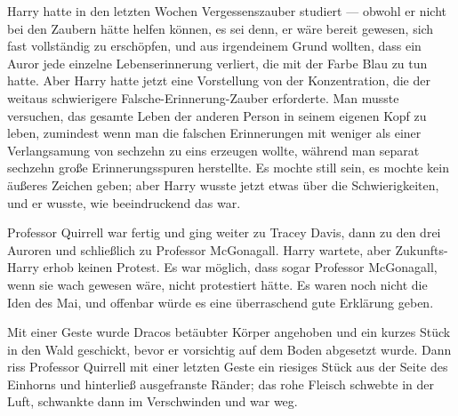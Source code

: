 Harry hatte in den letzten Wochen Vergessenszauber studiert — obwohl er nicht bei den Zaubern hätte helfen können, es sei denn, er wäre bereit gewesen, sich fast vollständig zu erschöpfen, und aus irgendeinem Grund wollten, dass ein Auror jede einzelne Lebenserinnerung verliert, die mit der Farbe Blau zu tun hatte. Aber Harry hatte jetzt eine Vorstellung von der Konzentration, die der weitaus schwierigere Falsche-Erinnerung-Zauber erforderte. Man musste versuchen, das gesamte Leben der anderen Person in seinem eigenen Kopf zu leben, zumindest wenn man die falschen Erinnerungen mit weniger als einer Verlangsamung von sechzehn zu eins erzeugen wollte, während man separat sechzehn große Erinnerungsspuren herstellte. Es mochte still sein, es mochte kein äußeres Zeichen geben; aber Harry wusste jetzt etwas über die Schwierigkeiten, und er wusste, wie beeindruckend das war.

Professor Quirrell war fertig und ging weiter zu Tracey Davis, dann zu den drei Auroren und schließlich zu Professor McGonagall. Harry wartete, aber Zukunfts-Harry erhob keinen Protest. Es war möglich, dass sogar Professor McGonagall, wenn sie wach gewesen wäre, nicht protestiert hätte. Es waren noch nicht die Iden des Mai, und offenbar würde es eine überraschend gute Erklärung geben.

Mit einer Geste wurde Dracos betäubter Körper angehoben und ein kurzes Stück in den Wald geschickt, bevor er vorsichtig auf dem Boden abgesetzt wurde. Dann riss Professor Quirrell mit einer letzten Geste ein riesiges Stück aus der Seite des Einhorns und hinterließ ausgefranste Ränder; das rohe Fleisch schwebte in der Luft, schwankte dann im Verschwinden und war weg.

